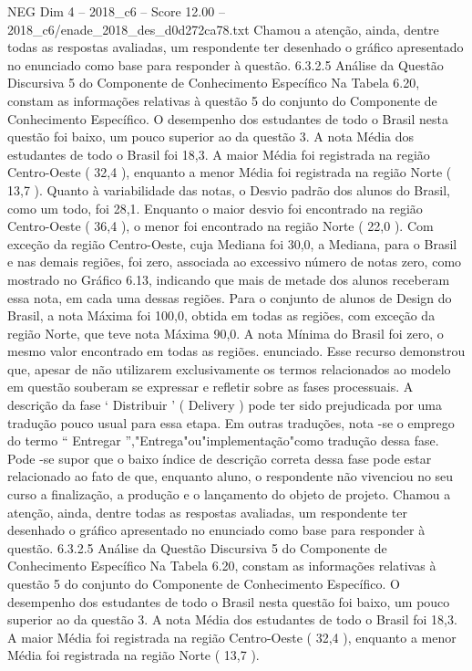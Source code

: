 \begin{textsample}{NEG Dim 4 – 2018\_c6 – Score 12.00 – 2018\_c6/enade\_2018\_des\_d0d272ca78.txt}
Chamou a atenção, ainda, dentre todas as respostas avaliadas, um respondente ter desenhado o gráfico apresentado no enunciado como base para responder à questão. 6.3.2.5 Análise da Questão Discursiva 5 do Componente de Conhecimento Específico Na Tabela 6.20, constam as informações relativas à questão 5 do conjunto do Componente de Conhecimento Específico.
O desempenho dos estudantes de todo o Brasil nesta questão foi baixo, um pouco superior ao da questão 3.
A nota Média dos estudantes de todo o Brasil foi 18,3.
A maior Média foi registrada na região Centro-Oeste ( 32,4 ), enquanto a menor Média foi registrada na região Norte ( 13,7 ).
Quanto à variabilidade das notas, o Desvio padrão dos alunos do Brasil, como um todo, foi 28,1.
Enquanto o maior desvio foi encontrado na região Centro-Oeste ( 36,4 ), o menor foi encontrado na região Norte ( 22,0 ).
Com exceção da região Centro-Oeste, cuja Mediana foi 30,0, a Mediana, para o Brasil e nas demais regiões, foi zero, associada ao excessivo número de notas zero, como mostrado no Gráfico 6.13, indicando que mais de metade dos alunos receberam essa nota, em cada uma dessas regiões.
Para o conjunto de alunos de Design do Brasil, a nota Máxima foi 100,0, obtida em todas as regiões, com exceção da região Norte, que teve nota Máxima 90,0.
A nota Mínima do Brasil foi zero, o mesmo valor encontrado em todas as regiões. enunciado.
Esse recurso demonstrou que, apesar de não utilizarem exclusivamente os termos relacionados ao modelo em questão souberam se expressar e refletir sobre as fases processuais.
A descrição da fase ‘ Distribuir ’ ( Delivery ) pode ter sido prejudicada por uma tradução pouco usual para essa etapa.
Em outras traduções, nota -se o emprego do termo “ Entregar ”,"Entrega"ou"implementação"como tradução dessa fase.
Pode -se supor que o baixo índice de descrição correta dessa fase pode estar relacionado ao fato de que, enquanto aluno, o respondente não vivenciou no seu curso a finalização, a produção e o lançamento do objeto de projeto.
Chamou a atenção, ainda, dentre todas as respostas avaliadas, um respondente ter desenhado o gráfico apresentado no enunciado como base para responder à questão. 6.3.2.5 Análise da Questão Discursiva 5 do Componente de Conhecimento Específico Na Tabela 6.20, constam as informações relativas à questão 5 do conjunto do Componente de Conhecimento Específico.
O desempenho dos estudantes de todo o Brasil nesta questão foi baixo, um pouco superior ao da questão 3.
A nota Média dos estudantes de todo o Brasil foi 18,3.
A maior Média foi registrada na região Centro-Oeste ( 32,4 ), enquanto a menor Média foi registrada na região Norte ( 13,7 ).

\end{textsample}
